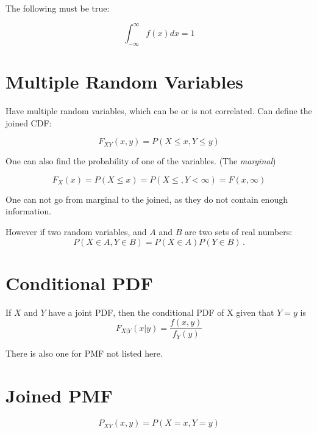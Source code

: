 The following must be true:

$$
\int_{-\infty}^{\infty} f(x) dx = 1
$$

\section{Multiple Random Variables}

Have multiple random variables, which can be or is not correlated.
Can define the joined CDF:

$$
F_{XY}(x,y) = P(X \leq x, Y \leq y)
$$

One can also find the probability of one of the variables. (The \emph{marginal})

$$
F_X(x) = P(X \leq x) = P(X \leq, Y < \infty) = F(x, \infty)
$$

One can not go from marginal to the joined, as they do not contain enough information.

However if two random variables, and $A$ and $B$ are two sets of real numbers:
\[
    P(X \in A, Y \in B) = P(X \in A) P(Y \in B)\,.
\]

\section{Conditional PDF}

If $X$ and $Y$ have a joint PDF, then the conditional PDF of X given that $Y=y$ is
\[
    F_{X|Y}(x|y) = \frac {f(x, y)} {f_Y(y)}
\]

There is also one for PMF not listed here.

\section{Joined PMF}

$$
P_{XY}(x,y) = P(X = x, Y = y)
$$

